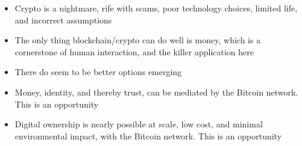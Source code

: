 {\begin{itemize}
\item Crypto is a nightmare, rife with scams, poor technology choices, limited life, and incorrect assumptions
\item The only thing blockchain/crypto can do well is money, which is a cornerstone of human interaction, and the killer application here
\item There do seem to be better options emerging
\item Money, identity, and thereby trust, can be mediated by the Bitcoin network. This is an opportunity
\item Digital ownership is nearly possible at scale, low cost, and minimal environmental impact, with the Bitcoin network. This is an opportunity
\end{itemize}
}
